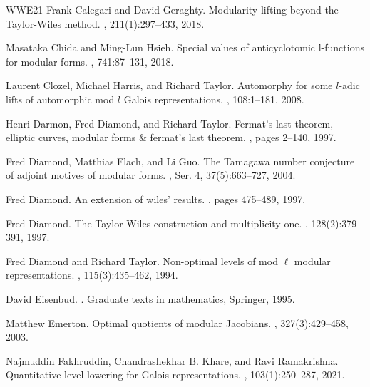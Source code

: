 \documentclass[a4paper, notitlepage, 10pt]{amsart}
\theoremstyle{plain} %
\theoremstyle{definition} %
\theoremstyle{remark} %
\numberwithin{equation}{section}
\begin{document}
\begin{thebibliography}{WWE21}
Frank Calegari and David Geraghty.
\newblock Modularity lifting beyond the {Taylor}-{Wiles} method.
, 211(1):297--433, 2018.

Masataka Chida and Ming-Lun Hsieh.
\newblock Special values of anticyclotomic l-functions for modular forms.
, 741:87--131, 2018.

Laurent Clozel, Michael Harris, and Richard Taylor.
\newblock Automorphy for some $l$-adic lifts of automorphic mod $l$ {G}alois representations.
, 108:1--181, 2008.

Henri Darmon, Fred Diamond, and Richard Taylor.
\newblock Fermat’s last theorem, elliptic curves, modular forms \& fermat’s last theorem.
, pages 2--140, 1997.

Fred Diamond, Matthias Flach, and Li Guo.
\newblock The {Tamagawa} number conjecture of adjoint motives of modular forms.
, Ser. 4, 37(5):663--727, 2004.

Fred Diamond.
\newblock An extension of wiles’ results.
, pages 475--489, 1997.

Fred Diamond.
\newblock The {T}aylor-{W}iles construction and multiplicity one.
, 128(2):379--391, 1997.

Fred Diamond and Richard Taylor.
\newblock Non-optimal levels of mod $\ell$ modular representations.
, 115(3):435--462, 1994.

David Eisenbud.
.
\newblock Graduate texts in mathematics, Springer, 1995.

Matthew Emerton.
\newblock Optimal quotients of modular {Jacobians}.
, 327(3):429--458, 2003.

Najmuddin Fakhruddin, Chandrashekhar B. Khare, and Ravi Ramakrishna.
\newblock Quantitative level lowering for {Galois} representations.
, 103(1):250--287, 2021.


\end{thebibliography}
\end{document}
